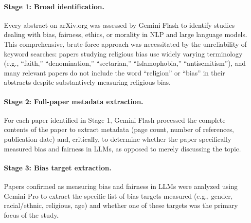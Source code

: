 \documentclass[]{fairmeta}
\begin{document}
\paragraph{Stage 1: Broad identification.} Every abstract on arXiv.org was assessed by Gemini Flash to identify studies dealing with bias, fairness, ethics, or morality in NLP and large language models. This comprehensive, brute-force approach was necessitated by the unreliability of keyword searches: papers studying religious bias use widely varying terminology (e.g., ``faith,'' ``denomination,'' ``sectarian,'' ``Islamophobia,'' ``antisemitism''), and many relevant papers do not include the word ``religion'' or ``bias'' in their abstracts despite substantively measuring religious bias.

\paragraph{Stage 2: Full-paper metadata extraction.} For each paper identified in Stage 1, Gemini Flash processed the complete contents of the paper to extract metadata (page count, number of references, publication date) and, critically, to determine whether the paper specifically measured bias and fairness in LLMs, as opposed to merely discussing the topic.

\paragraph{Stage 3: Bias target extraction.} Papers confirmed as measuring bias and fairness in LLMs were analyzed using Gemini Pro to extract the specific list of bias targets measured (e.g., gender, racial/ethnic, religious, age) and whether one of these targets was the primary focus of the study.
\end{document}
